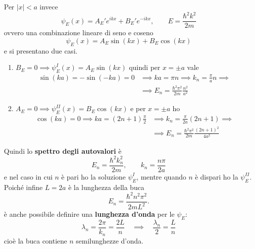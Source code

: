 \bigskip
\noindent
Per \( |x| < a \) invece
\[
\psi_E(x) = A_E' e^{ikx} + B_E' e^{-ikx}, \qquad E = \frac{\hbar^2 k^2}{2m}
\]
ovvero una combinazione lineare di seno e coseno
\[
\psi_E(x) = A_E \sin(kx) + B_E \cos(kx)
\]
e si presentano due casi.
\begin{enumerate}
\item \( B_E = 0 \implies \psi_E^I(x) = A_E \sin(kx) \) quindi per \( x = \pm a \) vale
\begin{align*}
\sin(ka) = -\sin(-ka) = 0 &\implies ka = \pi n \implies k_n = \frac{\pi}{a} n \implies \\
&\implies E_n = \frac{\hbar^2 \pi^2}{2m} \frac{n^2}{a^2}
\end{align*}
\item \( A_E = 0 \implies \psi_E^{II}(x) = B_E \cos(kx) \) e per \( x = \pm a \) ho
\begin{align*}
\cos(ka) = 0 \implies ka = (2n + 1) \frac{\pi}{2} &\implies k_n = \frac{\pi}{2a}(2n + 1) \implies \\ 
&\implies E_n = \frac{\hbar^2 \pi^2}{2m} \frac{(2n + 1)^2}{4a^2}
\end{align*}
\end{enumerate}
Quindi lo \textbf{spettro degli autovalori} è
\[
E_n = \frac{\hbar^2 k_n^2}{2m}, \qquad k_n = \frac{n\pi}{2a}
\]
e nel caso in cui \( n \) è pari ho la soluzione \( \psi_E^I \), mentre quando \( n \) è dispari ho la \( \psi_E^{II} \). Poiché infine \( L = 2a \) è la lunghezza della buca
\[
E_n = \frac{\hbar^2 n^2 \pi^2}{2 m L^2}.
\]
è anche possibile definire una \textbf{lunghezza d'onda} per le \( \psi_E \):
\[
\lambda_n = \frac{2\pi}{k_n} = \frac{2L}{n} \quad \implies \quad \frac{\lambda_n}{2} = \frac{L}{n}
\]
cioè la buca contiene \( n \) semilunghezze d'onda.

